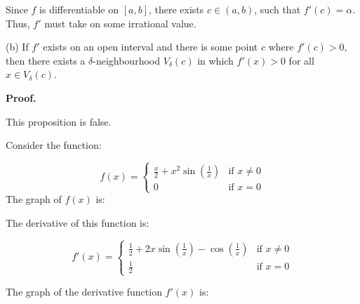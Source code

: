 \documentclass[10pt]{article}
\begin{document}
Since $\displaystyle f$ is differentiable on $\displaystyle [ a,b]$, there exists $\displaystyle c\in ( a,b)$, such that $\displaystyle f'( c) =\alpha $. Thus, $\displaystyle f'$ must take on some irrational value.



(b) If $\displaystyle f'$ exists on an open interval and there is some point $\displaystyle c$ where $\displaystyle f'( c)  >0$, then there exists a $\displaystyle \delta $-neighbourhood $\displaystyle V_{\delta }( c)$ in which $\displaystyle f'( x)  >0$ for all $\displaystyle x\in V_{\delta }( c)$. 



\textbf{Proof.} \ \ 



This proposition is false. 



Consider the function:


\begin{equation*}
f( x) =\begin{cases}
\frac{x}{2} +x^{2}\sin\left(\frac{1}{x}\right) & \text{if } x\neq 0\\
0 & \text{if } x=0
\end{cases}
\end{equation*}
The graph of $\displaystyle f( x)$ is:



\begin{tikzpicture}[x=0.75pt,y=0.75pt,yscale=-1,xscale=1]





\end{tikzpicture}



The derivative of this function is:


\begin{equation*}
f'( x) =\begin{cases}
\frac{1}{2} +2x\sin\left(\frac{1}{x}\right) -\cos\left(\frac{1}{x}\right) & \text{if } x\neq 0\\
\frac{1}{2} & \text{if } x=0
\end{cases}
\end{equation*}


The graph of the derivative function $\displaystyle f'( x)$ is:
\end{document}
